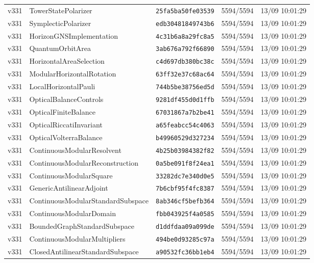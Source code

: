\documentclass[11pt]{article}
\theoremstyle{definition}\newtheorem{deriv}{Derivação}
\begin{document}
{\begin{longtable}{@{}lllll@{}}
v331 & TowerStatePolarizer & \texttt{25fa5ba50fe03539} & 5594/5594 & 13/09 10:01:29 \\
v331 & SymplecticPolarizer & \texttt{edb30481849743b6} & 5594/5594 & 13/09 10:01:29 \\
v331 & HorizonGNSImplementation & \texttt{4c31b6a8a29fc8a5} & 5594/5594 & 13/09 10:01:29 \\
v331 & QuantumOrbitArea & \texttt{3ab676a792f66890} & 5594/5594 & 13/09 10:01:29 \\
v331 & HorizontalAreaSelection & \texttt{c4d697db380bc38c} & 5594/5594 & 13/09 10:01:29 \\
v331 & ModularHorizontalRotation & \texttt{63ff32e37c68ac64} & 5594/5594 & 13/09 10:01:29 \\
v331 & LocalHorizontalPauli & \texttt{744b5be38756ed5d} & 5594/5594 & 13/09 10:01:29 \\
v331 & OpticalBalanceControls & \texttt{9281df455d0d1ffb} & 5594/5594 & 13/09 10:01:29 \\
v331 & OpticalFiniteBalance & \texttt{67031867a7b2be41} & 5594/5594 & 13/09 10:01:29 \\
v331 & OpticalRiccatiInvariant & \texttt{a65feabcc54c4063} & 5594/5594 & 13/09 10:01:29 \\
v331 & OpticalVolterraBalance & \texttt{b49960529d327234} & 5594/5594 & 13/09 10:01:29 \\
v331 & ContinuousModularResolvent & \texttt{4b25b03984382f82} & 5594/5594 & 13/09 10:01:29 \\
v331 & ContinuousModularReconstruction & \texttt{0a5be091f8f24ea1} & 5594/5594 & 13/09 10:01:29 \\
v331 & ContinuousModularSquare & \texttt{33282dc7e340d0e5} & 5594/5594 & 13/09 10:01:29 \\
v331 & GenericAntilinearAdjoint & \texttt{7b6cbf95f4fc8387} & 5594/5594 & 13/09 10:01:29 \\
v331 & ContinuousModularStandardSubspace & \texttt{8ab346cf5befb364} & 5594/5594 & 13/09 10:01:29 \\
v331 & ContinuousModularDomain & \texttt{fbb043925f4a0585} & 5594/5594 & 13/09 10:01:29 \\
v331 & BoundedGraphStandardSubspace & \texttt{d1ddfdaa09a099de} & 5594/5594 & 13/09 10:01:29 \\
v331 & ContinuousModularMultipliers & \texttt{494be0d93285c97a} & 5594/5594 & 13/09 10:01:29 \\
v331 & ClosedAntilinearStandardSubspace & \texttt{a90532fc36bb1eb4} & 5594/5594 & 13/09 10:01:29 \\

\end{longtable}}
\end{document}
